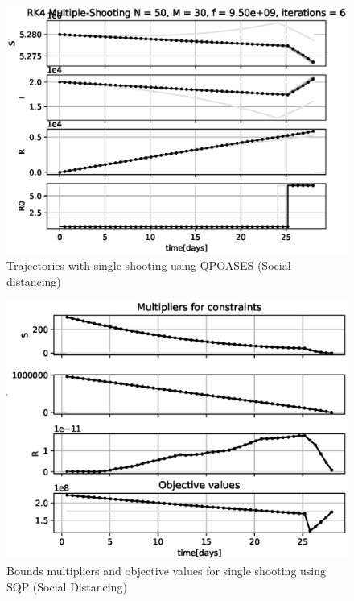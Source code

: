 \begin{figure}[H]
    \centering
    \includegraphics[width=.8\textwidth]{pythonProject/Figures/Multiple_Shooting_Trajectory_SQP_Social_Distancing.eps}
    \caption{Trajectories with single shooting using QPOASES (Social distancing)}
    \label{fig:SH_Traj_SQP_SD}
\end{figure}

\begin{figure}[H]
    \centering
    \includegraphics[width=.8\textwidth]{pythonProject/Figures/Multiple_Shooting_obj_con_SQP_Social_Distancing.eps}
    \caption{Bounds multipliers and objective values for single shooting using SQP (Social Distancing)}
    \label{fig:SH_con_obj_SQP_SD}
\end{figure}

